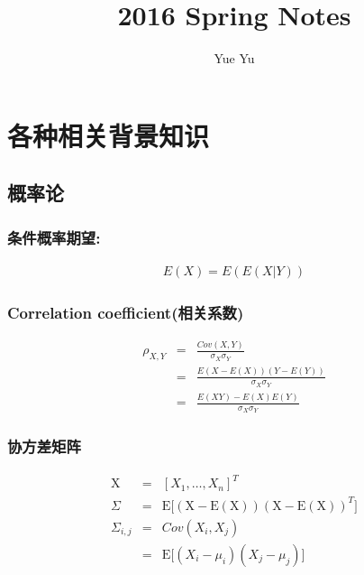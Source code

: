 \documentclass{article} 	%
\title{2016 Spring Notes}
\author{Yue Yu}
\begin{document}
\maketitle
\tableofcontents
\newpage

\section{各种相关背景知识}
	\subsection{概率论}
		\subsubsection{条件概率期望:}
			\begin{eqnarray}
			E(X) = E(E(X|Y))
			\end{eqnarray}
		\subsubsection{Correlation coefficient(相关系数)}
			\begin{eqnarray}
				\rho_{\scriptscriptstyle X,\scriptscriptstyle Y} &=& \frac{Cov(X,Y)}{\sigma_{\scriptscriptstyle X}\sigma_{\scriptscriptstyle Y}}\\
				&=& \frac{E(X-E(X))(Y-E(Y))}{\sigma_{\scriptscriptstyle X}\sigma_{\scriptscriptstyle Y}}\\
				&=& \frac{E(XY)-E(X)E(Y)}{\sigma_{\scriptscriptstyle X}\sigma_{\scriptscriptstyle Y}}
			\end{eqnarray}
		\subsubsection{协方差矩阵}
                        \begin{eqnarray}
                        	       \mathrm{X} &=& [X_1,\ldots,X_n]^T\\
                                \Sigma &=& \mathrm{E}\Big[(\mathrm{X}-\mathrm{E}(\mathrm{X}))(\mathrm{X}-\mathrm{E}(\mathrm{X}))^T\Big]\\
                                \Sigma_{i,j} &=& Cov(X_i, X_j)\\
                                &=& \mathrm{E}\Big[(X_i - \mu_i)(X_j - \mu_j)\Big]
                        \end{eqnarray}
\end{document}
